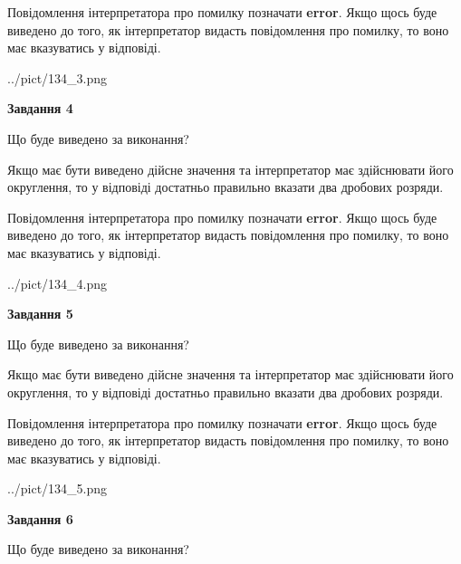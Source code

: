 \documentclass[12pt, ukrainian]{article}
\begin{document}
{\begin {Large}
Повідомлення інтерпретатора про помилку позначати \textbf{error}.
Якщо щось буде виведено до того, як інтерпретатор видасть повідомлення про помилку, 
то воно має вказуватись у відповіді. \par

\begin{center}
	{../pict/134_3.png}
\end{center}
\newpage

{\begin {center}\textbf{Завдання 4}\end {center}}\par
Що буде виведено за виконання? \par

Якщо має бути виведено дійсне значення та інтерпретатор має здійснювати його округлення, 
то у відповіді достатньо правильно вказати два дробових розряди.

Повідомлення інтерпретатора про помилку позначати \textbf{error}.
Якщо щось буде виведено до того, як інтерпретатор видасть повідомлення про помилку, 
то воно має вказуватись у відповіді. \par

\begin{center}
	{../pict/134_4.png}
\end{center}
\newpage

{\begin {center}\textbf{Завдання 5}\end {center}}\par
Що буде виведено за виконання? \par

Якщо має бути виведено дійсне значення та інтерпретатор має здійснювати його округлення, 
то у відповіді достатньо правильно вказати два дробових розряди.

Повідомлення інтерпретатора про помилку позначати \textbf{error}.
Якщо щось буде виведено до того, як інтерпретатор видасть повідомлення про помилку, 
то воно має вказуватись у відповіді. \par

\begin{center}
	{../pict/134_5.png}
\end{center}
\newpage

{\begin {center}\textbf{Завдання 6}\end {center}}\par
Що буде виведено за виконання? \par


\end{Large}}
\end{document}
